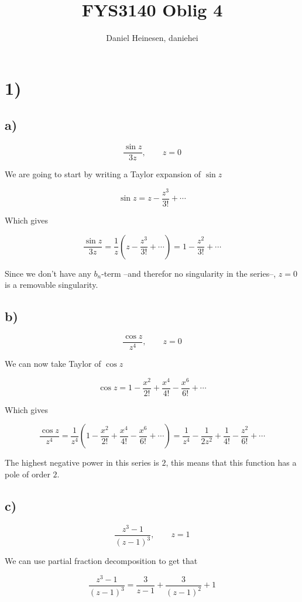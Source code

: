 \documentclass[a4paper,norsk, 10pt]{article}
\title{FYS3140 Oblig 4}
\author{Daniel Heinesen, daniehei}
\begin{document}
\maketitle

\section*{1)}
\subsection*{a)}
$$
\frac{\sin z}{3z},\qquad z = 0
$$

We are going to start by writing a Taylor expansion of $\sin z$

\begin{equation}
\sin z = z - \frac{z^3}{3!} + \cdots
\label{eq:sin}
\end{equation}

Which gives

$$
\frac{\sin z}{3z} = \frac{1}{z}\left(z - \frac{z^3}{3!} + \cdots \right) = 1-\frac{z^2}{3!} + \cdots
$$

Since we don't have any $b_n$-term --and therefor no singularity in the series--, $z = 0$ is a removable singularity.

\subsection*{b)}
$$
\frac{\cos z}{z^4}, \qquad z=0
$$

We can now take Taylor of $\cos z$

$$
\cos z = 1 - \frac{x^2}{2!}+\frac{x^4}{4!}-\frac{x^6}{6!} + \cdots
$$

Which gives

$$
\frac{\cos z}{z^4} = \frac{1}{z^4}\left(1 - \frac{x^2}{2!}+\frac{x^4}{4!}-\frac{x^6}{6!} + \cdots\right) = \frac{1}{z^4}-\frac{1}{2z^2}+\frac{1}{4!}-\frac{z^2}{6!} + \cdots
$$


The highest negative power in this series is $2$, this means that this function has a pole of order $2$.

\subsection*{c)}
$$
\frac{z^3-1}{(z-1)^3},\qquad z = 1
$$

We can use partial fraction decomposition to get that

$$
\frac{z^3-1}{(z-1)^3} = \frac{3}{z-1} + \frac{3}{(z-1)^2} + 1
$$
\end{document}
